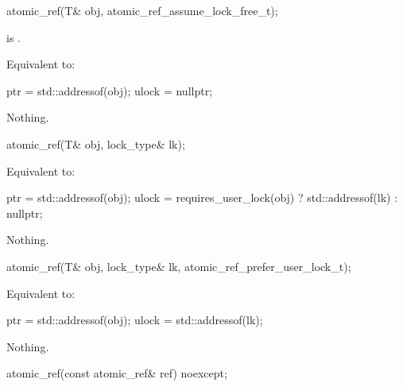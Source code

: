 \begin{addedblock}
\begin{itemdecl}
atomic_ref(T& obj, atomic_ref_assume_lock_free_t);
\end{itemdecl}

\begin{itemdescr}
\pnum
\expects {} is .

\pnum
\effects Equivalent to:
\begin{codeblock}
  ptr = std::addressof(obj);
  ulock = nullptr;
\end{codeblock}

\pnum
\throws Nothing.

\end{itemdescr}
\end{addedblock}


\begin{addedblock}
\begin{itemdecl}
atomic_ref(T& obj, lock_type& lk);
\end{itemdecl}

\begin{itemdescr}

\pnum
\effects Equivalent to:
\begin{codeblock}
  ptr = std::addressof(obj);
  ulock = requires_user_lock(obj) ? std::addressof(lk) : nullptr;
\end{codeblock}

\pnum
\throws Nothing.

\end{itemdescr}
\end{addedblock}


\begin{addedblock}
\begin{itemdecl}
atomic_ref(T& obj, lock_type& lk, atomic_ref_prefer_user_lock_t);
\end{itemdecl}

\begin{itemdescr}

\pnum
\effects Equivalent to:
\begin{codeblock}
  ptr = std::addressof(obj);
  ulock = std::addressof(lk);
\end{codeblock}

\pnum
\throws Nothing.
\end{itemdescr}

\end{addedblock}


\begin{itemdecl}
atomic_ref(const atomic_ref& ref) noexcept;
\end{itemdecl}

